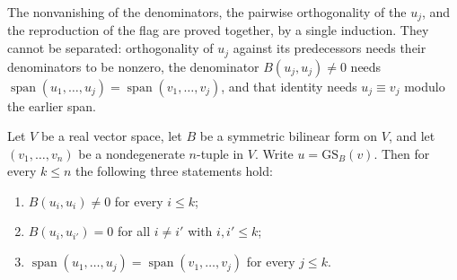 The nonvanishing of the denominators, the pairwise orthogonality of the $u_j$, and the reproduction of the flag are proved together, by a single induction. They cannot be separated: orthogonality of $u_j$ against its predecessors needs their denominators to be nonzero, the denominator $B(u_j,u_j) \neq 0$ needs $\operatorname{span}(u_1,\ldots,u_j) = \operatorname{span}(v_1,\ldots,v_j)$, and that identity needs $u_j \equiv v_j$ modulo the earlier span.

\begin{proposition}
\label{prop:gram-schmidt-bilin-spec}
\leanok
{}
Let $V$ be a real vector space, let $B$ be a symmetric bilinear form on $V$, and let $(v_1,\ldots,v_n)$ be a nondegenerate $n$-tuple in $V$. Write $u = \mathrm{GS}_B(v)$. Then for every $k \leq n$ the following three statements hold:
\begin{enumerate}[label=(\alph*)]
\item $B(u_i,u_i) \neq 0$ for every $i \leq k$;
\item $B(u_i,u_{i'}) = 0$ for all $i \neq i'$ with $i,i' \leq k$;
\item $\operatorname{span}(u_1,\ldots,u_j) = \operatorname{span}(v_1,\ldots,v_j)$ for every $j \leq k$.
\end{enumerate}
\end{proposition}

